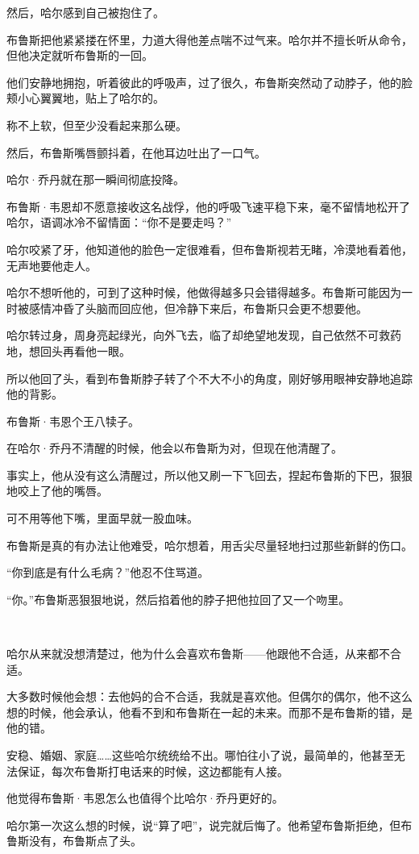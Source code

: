 \documentclass[../main]{subfiles}
\begin{document}
然后，哈尔感到自己被抱住了。

布鲁斯把他紧紧搂在怀里，力道大得他差点喘不过气来。哈尔并不擅长听从命令，但他决定就听布鲁斯的一回。

他们安静地拥抱，听着彼此的呼吸声，过了很久，布鲁斯突然动了动脖子，他的脸颊小心翼翼地，贴上了哈尔的。

称不上软，但至少没看起来那么硬。

然后，布鲁斯嘴唇颤抖着，在他耳边吐出了一口气。

哈尔·乔丹就在那一瞬间彻底投降。

布鲁斯·韦恩却不愿意接收这名战俘，他的呼吸飞速平稳下来，毫不留情地松开了哈尔，语调冰冷不留情面：“你不是要走吗？”

哈尔咬紧了牙，他知道他的脸色一定很难看，但布鲁斯视若无睹，冷漠地看着他，无声地要他走人。

哈尔不想听他的，可到了这种时候，他做得越多只会错得越多。布鲁斯可能因为一时被感情冲昏了头脑而回应他，但冷静下来后，布鲁斯只会更不想要他。

哈尔转过身，周身亮起绿光，向外飞去，临了却绝望地发现，自己依然不可救药地，想回头再看他一眼。

所以他回了头，看到布鲁斯脖子转了个不大不小的角度，刚好够用眼神安静地追踪他的背影。

布鲁斯·韦恩个王八犊子。

在哈尔·乔丹不清醒的时候，他会以布鲁斯为对，但现在他清醒了。

事实上，他从没有这么清醒过，所以他又刷一下飞回去，捏起布鲁斯的下巴，狠狠地咬上了他的嘴唇。

可不用等他下嘴，里面早就一股血味。

布鲁斯是真的有办法让他难受，哈尔想着，用舌尖尽量轻地扫过那些新鲜的伤口。

“你到底是有什么毛病？”他忍不住骂道。

“你。”布鲁斯恶狠狠地说，然后掐着他的脖子把他拉回了又一个吻里。

~\

哈尔从来就没想清楚过，他为什么会喜欢布鲁斯——他跟他不合适，从来都不合适。

大多数时候他会想：去他妈的合不合适，我就是喜欢他。但偶尔的偶尔，他不这么想的时候，他会承认，他看不到和布鲁斯在一起的未来。而那不是布鲁斯的错，是他的错。

安稳、婚姻、家庭……这些哈尔统统给不出。哪怕往小了说，最简单的，他甚至无法保证，每次布鲁斯打电话来的时候，这边都能有人接。

他觉得布鲁斯·韦恩怎么也值得个比哈尔·乔丹更好的。

哈尔第一次这么想的时候，说“算了吧”，说完就后悔了。他希望布鲁斯拒绝，但布鲁斯没有，布鲁斯点了头。
\end{document}
